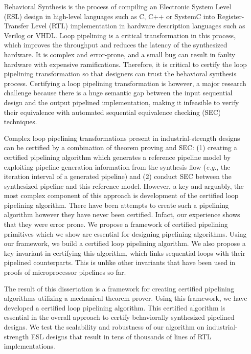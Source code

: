 Behavioral Synthesis is the process of compiling an Electronic System Level (ESL) design in high-level languages such as C, C++ or SystemC into Register-Transfer Level (RTL) implementation in hardware description languages such as Verilog or VHDL.
Loop pipelining is a critical transformation in this process, which improves
the throughput and reduces the latency of the synthesized hardware. It is
complex and error-prone, and a small bug can result in faulty hardware with expensive
ramifications. Therefore, it is critical to certify the loop pipelining transformation
so that designers can trust the behavioral synthesis process.
Certifying a loop pipelining transformation is however, a major research challenge
because there is a huge semantic gap between the input sequential design and the output pipelined implementation, making it infeasible to verify their equivalence with automated sequential equivalence checking (SEC) techniques.

Complex loop pipelining transformations present in industrial-strength designs can be certified by a combination of theorem proving and SEC: (1) creating a certified pipelining algorithm which generates a reference pipeline model by exploiting pipeline generation information from the synthesis flow ({\em e.g.}, the iteration interval of a generated pipeline) and (2) conduct SEC between the synthesized pipeline and this reference model. However, a key and arguably, the most complex component of this approach is development of the certified loop pipelining algorithm. There have been attempts to create such a pipelining algorithm however they have never been certified. Infact, our experience shows that they were error prone. We propose a framework of certified pipelining primitives which we show are essential for designing pipelining algorithms. Using our framework, we build a certified loop pipelining algorithm. We also propose a key invariant in certifying this algorithm, which links sequential loops with their pipelined counterparts. This is unlike other invariants that have been used in proofs of microprocessor pipelines so far.

The result of this dissertation is a framework for creating certified pipelining algorithms
utilizing a mechanical theorem prover. Using this framework, we have developed a certified loop pipelining algorithm. This certified algorithm is essential in the overall approach to certify behaviorally synthesized pipelined designs. We test the scalability and robustness of our algorithm on industrial-strength ESL designs that result in tens of thousands of lines of RTL implementations.
